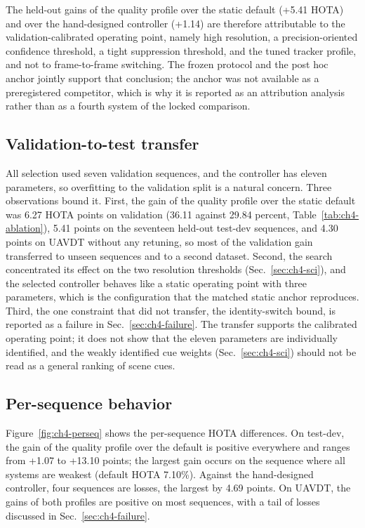 The held-out gains of the quality profile over the static default (+5.41 HOTA) and over the hand-designed controller (+1.14) are therefore attributable to the validation-calibrated operating point, namely high resolution, a precision-oriented confidence threshold, a tight suppression threshold, and the tuned tracker profile, and not to frame-to-frame switching. The frozen protocol and the post hoc anchor jointly support that conclusion; the anchor was not available as a preregistered competitor, which is why it is reported as an attribution analysis rather than as a fourth system of the locked comparison.

\subsection{Validation-to-test transfer}
All selection used seven validation sequences, and the controller has eleven parameters, so overfitting to the validation split is a natural concern. Three observations bound it. First, the gain of the quality profile over the static default was 6.27 HOTA points on validation (36.11 against 29.84 percent, Table~\ref{tab:ch4-ablation}), 5.41 points on the seventeen held-out test-dev sequences, and 4.30 points on UAVDT without any retuning, so most of the validation gain transferred to unseen sequences and to a second dataset. Second, the search concentrated its effect on the two resolution thresholds (Sec.~\ref{sec:ch4-sci}), and the selected controller behaves like a static operating point with three parameters, which is the configuration that the matched static anchor reproduces. Third, the one constraint that did not transfer, the identity-switch bound, is reported as a failure in Sec.~\ref{sec:ch4-failure}. The transfer supports the calibrated operating point; it does not show that the eleven parameters are individually identified, and the weakly identified cue weights (Sec.~\ref{sec:ch4-sci}) should not be read as a general ranking of scene cues.

\subsection{Per-sequence behavior}
Figure~\ref{fig:ch4-perseq} shows the per-sequence HOTA differences. On test-dev, the gain of the quality profile over the default is positive everywhere and ranges from +1.07 to +13.10 points; the largest gain occurs on the sequence where all systems are weakest (default HOTA 7.10\%). Against the hand-designed controller, four sequences are losses, the largest by 4.69 points. On UAVDT, the gains of both profiles are positive on most sequences, with a tail of losses discussed in Sec.~\ref{sec:ch4-failure}.

